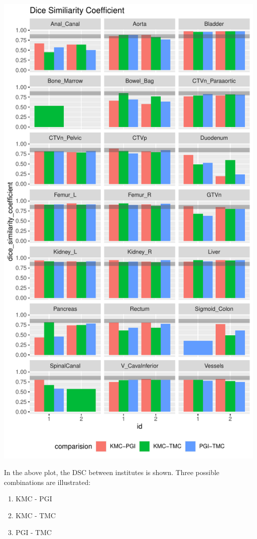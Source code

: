 \documentclass[
  letterpaper,
  DIV=11,
  numbers=noendperiod]{scrartcl}
\providecommand{\tightlist}{%
  \setlength{\itemsep}{0pt}\setlength{\parskip}{0pt}}\usepackage{longtable,booktabs,array}
\begin{document}
\includegraphics{analysis_files/figure-pdf/unnamed-chunk-7-1.pdf}

In the above plot, the DSC between institutes is shown. Three possible
combinations are illustrated:

\begin{enumerate}
\def\labelenumi{\arabic{enumi}.}
\tightlist
\item
  KMC - PGI
\item
  KMC - TMC
\item
  PGI - TMC
\end{enumerate}
\end{document}
